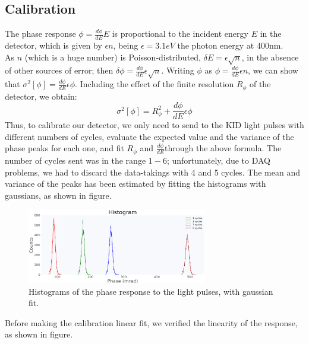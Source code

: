 \documentclass[12pt]{article}
\begin{document}
\subsection{Calibration}
The phase response $\phi = \frac{d \phi}{dE} E$ is proportional to the incident energy $E$ in the detector, which is given by $\epsilon n$, being $\epsilon = 3.1 eV$ the photon energy at 400nm.\\
As $n$ (which is a huge number) is Poisson-distributed, $\delta E = \epsilon \sqrt{n}$, in the absence of other sources of error; then $\delta \phi = \frac{d \phi}{dE} \epsilon \sqrt{n}$. Writing $\phi$ as $\phi = \frac{d \phi}{dE} \epsilon n$, we can show that $\sigma^2[\phi] = \frac{d \phi}{dE} \epsilon \phi$. Including the effect of the finite resolution $R_\phi$ of the detector, we obtain:
\begin{equation}
    \sigma^2[\phi] = R_\phi^2 + \frac{d \phi}{dE} \epsilon \phi
\end{equation}
Thus, to calibrate our detector, we only need to send to the KID light pulses with different numbers of cycles, evaluate the expected value and the variance of the phase peaks for each one, and fit $R_\phi$ and $\frac{d \phi}{dE}$through the above formula.
The number of cycles sent was in the range $1-6$; unfortunately, due to DAQ problems, we had to discard the data-takings with 4 and 5 cycles. The mean and variance of the peaks has been estimated by fitting the histograms with gaussians, as shown in figure.
\begin{figure}[H]
\centering
\includegraphics[width=0.7\textwidth]{hist_lungo.png}
\caption{Histograms of the phase response to the light pulses, with gaussian fit.}
\end{figure}
Before making the calibration linear fit, we verified the linearity of the response, as shown in figure. 
\end{document}
